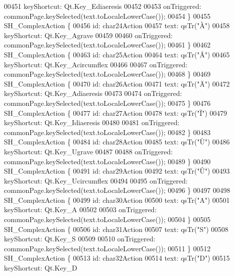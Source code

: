 \begin{DoxyCode}
00451         keyShortcut: Qt.Key\_Ediaeresis
00452 
00453         onTriggered: commonPage.keySelected(text.toLocaleLowerCase());
00454     \}
00455     SH\_ComplexAction \{
00456         \textcolor{keywordtype}{id}: char24Action
00457         text: qsTr(\textcolor{stringliteral}{"À"})
00458         keyShortcut: Qt.Key\_Agrave
00459 
00460         onTriggered: commonPage.keySelected(text.toLocaleLowerCase());
00461     \}
00462     SH\_ComplexAction \{
00463         \textcolor{keywordtype}{id}: char25Action
00464         text: qsTr(\textcolor{stringliteral}{"Â"})
00465         keyShortcut: Qt.Key\_Acircumflex
00466 
00467         onTriggered: commonPage.keySelected(text.toLocaleLowerCase());
00468     \}
00469     SH\_ComplexAction \{
00470         \textcolor{keywordtype}{id}: char26Action
00471         text: qsTr(\textcolor{stringliteral}{"Ä"})
00472         keyShortcut: Qt.Key\_Adiaeresis
00473 
00474         onTriggered: commonPage.keySelected(text.toLocaleLowerCase());
00475     \}
00476     SH\_ComplexAction \{
00477         \textcolor{keywordtype}{id}: char27Action
00478         text: qsTr(\textcolor{stringliteral}{"Ï"})
00479         keyShortcut: Qt.Key\_Idiaeresis
00480 
00481         onTriggered: commonPage.keySelected(text.toLocaleLowerCase());
00482     \}
00483     SH\_ComplexAction \{
00484         \textcolor{keywordtype}{id}: char28Action
00485         text: qsTr(\textcolor{stringliteral}{"Ù"})
00486         keyShortcut: Qt.Key\_Ugrave
00487 
00488         onTriggered: commonPage.keySelected(text.toLocaleLowerCase());
00489     \}
00490     SH\_ComplexAction \{
00491         \textcolor{keywordtype}{id}: char29Action
00492         text: qsTr(\textcolor{stringliteral}{"Û"})
00493         keyShortcut: Qt.Key\_Ucircumflex
00494 
00495         onTriggered: commonPage.keySelected(text.toLocaleLowerCase());
00496     \}
00497 
00498     SH\_ComplexAction \{
00499         \textcolor{keywordtype}{id}: char30Action
00500         text: qsTr(\textcolor{stringliteral}{"A"})
00501         keyShortcut: Qt.Key\_A
00502 
00503         onTriggered: commonPage.keySelected(text.toLocaleLowerCase());
00504     \}
00505     SH\_ComplexAction \{
00506         \textcolor{keywordtype}{id}: char31Action
00507         text: qsTr(\textcolor{stringliteral}{"S"})
00508         keyShortcut: Qt.Key\_S
00509 
00510         onTriggered: commonPage.keySelected(text.toLocaleLowerCase());
00511     \}
00512     SH\_ComplexAction \{
00513         \textcolor{keywordtype}{id}: char32Action
00514         text: qsTr(\textcolor{stringliteral}{"D"})
00515         keyShortcut: Qt.Key\_D

\end{DoxyCode}
